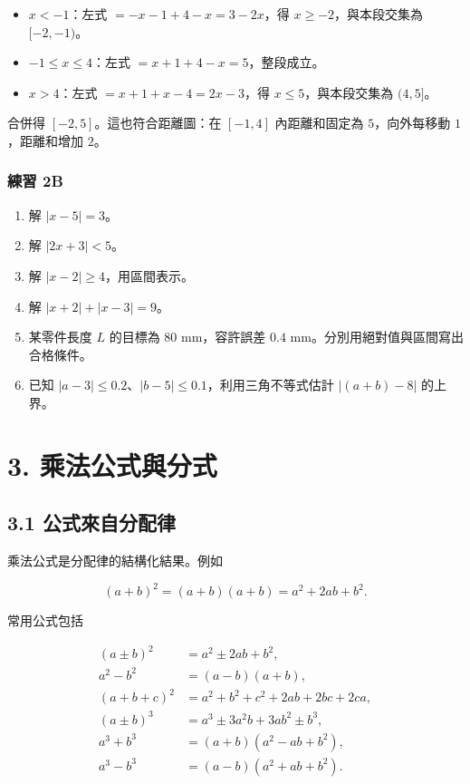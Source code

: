 \documentclass[11pt,a4paper]{article}
\providecommand{\tightlist}{%
  \setlength{\itemsep}{0pt}\setlength{\parskip}{0pt}}
\begin{document}
\begin{itemize}
\tightlist
\item
  \(x<-1\)：左式 \(=-x-1+4-x=3-2x\)，得 \(x\ge-2\)，與本段交集為 \([-2,-1)\)。
\item
  \(-1\le x\le4\)：左式 \(=x+1+4-x=5\)，整段成立。
\item
  \(x>4\)：左式 \(=x+1+x-4=2x-3\)，得 \(x\le5\)，與本段交集為 \((4,5]\)。
\end{itemize}

合併得 \(\boxed{[-2,5]}\)。這也符合距離圖：在 \([-1,4]\) 內距離和固定為 \(5\)，向外每移動 \(1\)，距離和增加 \(2\)。

\subsubsection{練習 2B}\label{ux7df4ux7fd2-2b}

\begin{enumerate}
\def\labelenumi{\arabic{enumi}.}
\tightlist
\item
  解 \(|x-5|=3\)。
\item
  解 \(|2x+3|<5\)。
\item
  解 \(|x-2|\ge4\)，用區間表示。
\item
  解 \(|x+2|+|x-3|=9\)。
\item
  某零件長度 \(L\) 的目標為 \(80\) mm，容許誤差 \(0.4\) mm。分別用絕對值與區間寫出合格條件。
\item
  已知 \(|a-3|\le0.2\)、\(|b-5|\le0.1\)，利用三角不等式估計 \(|(a+b)-8|\) 的上界。
\end{enumerate}

\section{3. 乘法公式與分式}\label{ux4e58ux6cd5ux516cux5f0fux8207ux5206ux5f0f}

\subsection{3.1 公式來自分配律}\label{ux516cux5f0fux4f86ux81eaux5206ux914dux5f8b}

乘法公式是分配律的結構化結果。例如

\[
(a+b)^2=(a+b)(a+b)=a^2+2ab+b^2.
\]

常用公式包括

\[
\begin{aligned}
(a\pm b)^2&=a^2\pm2ab+b^2,\\
a^2-b^2&=(a-b)(a+b),\\
(a+b+c)^2&=a^2+b^2+c^2+2ab+2bc+2ca,\\
(a\pm b)^3&=a^3\pm3a^2b+3ab^2\pm b^3,\\
a^3+b^3&=(a+b)(a^2-ab+b^2),\\
a^3-b^3&=(a-b)(a^2+ab+b^2).
\end{aligned}
\]
\end{document}

